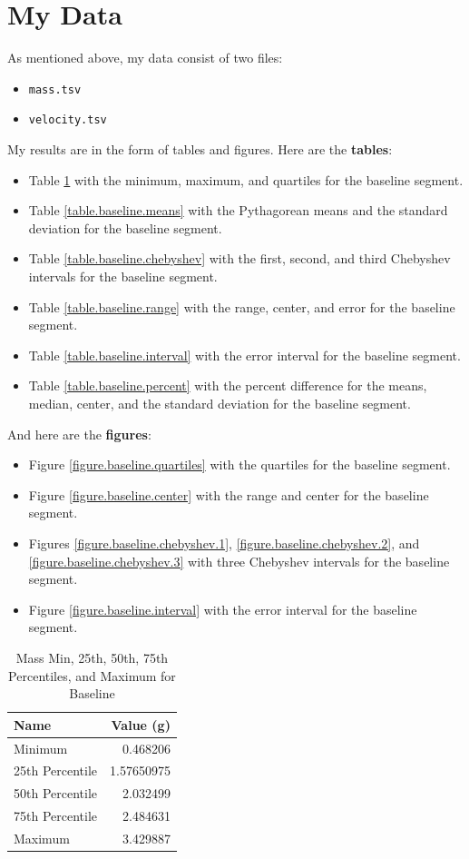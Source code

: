 \section{My Data}
As mentioned above, my data consist of two files:
\begin{itemize}
    \item \texttt{mass.tsv}
    \item \texttt{velocity.tsv}
\end{itemize}
My results are in the form of tables and figures. Here are the \textbf{tables}:
\begin{itemize}
    \item Table \ref{table.baseline.descriptive} with the minimum, maximum, and quartiles for the baseline segment.
    \item Table \ref{table.baseline.means} with the Pythagorean means and the standard deviation for the baseline segment.
    \item Table \ref{table.baseline.chebyshev} with the first, second, and third Chebyshev intervals for the baseline segment.
    \item Table \ref{table.baseline.range} with the range, center, and error for the baseline segment.
    \item Table \ref{table.baseline.interval} with the error interval for the baseline segment.
    \item Table \ref{table.baseline.percent} with the percent difference for the means, median, center, and the standard deviation for the baseline segment.
\end{itemize}
And here are the \textbf{figures}:
\begin{itemize}
    \item Figure \ref{figure.baseline.quartiles} with the quartiles for the baseline segment.
    \item Figure \ref{figure.baseline.center} with the range and center for the baseline segment.
    \item Figures \ref{figure.baseline.chebyshev.1}, \ref{figure.baseline.chebyshev.2}, and \ref{figure.baseline.chebyshev.3} with three Chebyshev intervals for the baseline segment.
    \item Figure \ref{figure.baseline.interval} with the error interval for the baseline segment.
\end{itemize}
\begin{table}
    \centering
	\begin{tabular}{|l|r|} \hline
        \textbf{Name} & \textbf{Value (g)} \\
        \hline
		Minimum & 0.468206 \\
		25th Percentile & 1.57650975 \\
		50th Percentile & 2.032499 \\
		75th Percentile & 2.484631 \\
		Maximum & 3.429887 \\
		\hline
	\end{tabular}
	\caption{Mass Min, 25th, 50th, 75th Percentiles, and Maximum for Baseline}
	\label{table.baseline.descriptive}
\end{table}
